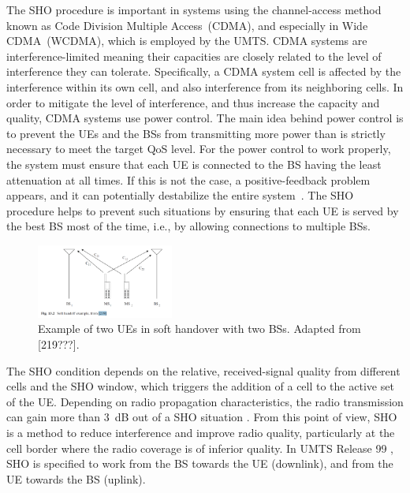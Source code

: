 The SHO procedure is important in systems using the channel-access
method known as Code Division Multiple Access~(CDMA),
and especially in Wide CDMA~(WCDMA),
which is employed by the UMTS. CDMA systems are interference-limited
meaning their capacities are closely related to the level of interference
they can tolerate. Specifically, a CDMA system cell is affected by
the interference within its own cell, and also interference from its
neighboring cells. In order to mitigate the level of interference,
and thus increase the capacity and quality, CDMA systems use power
control. The main idea behind power control is to prevent the UEs
and the BSs from transmitting more power than is strictly necessary
to meet the target QoS level. For the power control to work properly,
the system must ensure that each UE is connected to the BS having
the least attenuation at all times. If this is not the case, a positive-feedback
problem appears, and it can potentially destabilize the entire system~\cite{Wong-Soft_handoffs_in_CDMA_mobile_systems:1997}.
The SHO procedure helps to prevent such situations by ensuring that
each UE is served by the best BS most of the time, i.e., by allowing
connections to multiple BSs.

\begin{figure}
\centering

\includegraphics[width=0.4\textwidth]{02-background_and_motivation/img/soft_handover}

\caption{Example of two UEs in soft handover with two BSs. Adapted from {[}219???{]}.
\label{fig:02-SHO_example}}
\end{figure}


The SHO condition depends on the relative, received-signal quality
from different cells and the SHO window, which triggers the addition
of a cell to the active set of the UE. Depending on radio propagation
characteristics, the radio transmission can gain more than 3~dB out
of a SHO situation \cite{WCDMAforUMTS_RadioAccessForThirdGenerationMobileCommunications}.
From this point of view, SHO is a method to reduce interference and
improve radio quality, particularly at the cell border where the radio
coverage is of inferior quality. In UMTS Release 99 \cite{3GPP_R99},
SHO is specified to work from the BS towards the UE (downlink), and
from the UE towards the BS (uplink).

